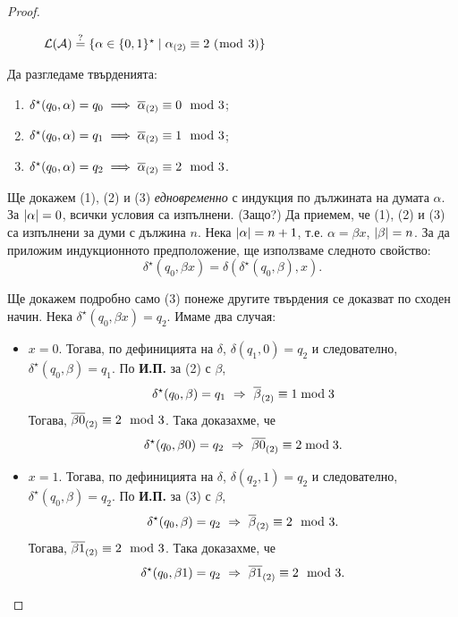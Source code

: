 \begin{proof}
\begin{framed}
\begin{figure}[H]
\begin{center}
      \end{center}
      \caption{$\L(\A) \stackrel{?}{=} \{\alpha\in\{0,1\}^\star \mid \alpha_{(2)} \equiv 2\ (\bmod\ 3)\}$}
 \end{figure}
 \end{framed}
 \noindent Да разгледаме твърденията:
 \begin{enumerate}[(1)]
  \item 
    $\delta^\star(q_0,\alpha) = q_0 \implies \overline{\alpha}_{(2)} \equiv 0 \mod 3$;
  \item 
    $\delta^\star(q_0,\alpha) = q_1 \implies \overline{\alpha}_{(2)} \equiv 1 \mod 3$;
  \item 
    $\delta^\star(q_0,\alpha) = q_2 \implies \overline{\alpha}_{(2)} \equiv 2 \mod 3$.
  \end{enumerate}
  Ще докажем (1), (2) и (3) {\em едновременно} с индукция по дължината на думата $\alpha$.
  За $\lvert{\alpha}\rvert = 0$, всички условия са изпълнени. (Защо?)
  Да приемем, че (1), (2) и (3) са изпълнени за думи с дължина $n$.
  Нека $\lvert{\alpha}\rvert = n+1$, т.е. $\alpha = \beta x$, $\lvert{\beta}\rvert = n$.
  За да приложим индукционното предположение, ще използваме следното свойство:
  \[\delta^\star(q_0,\beta x) = \delta(\delta^\star(q_0,\beta),x).\]
  
  Ще докажем подробно само (3) понеже другите твърдения се доказват по сходен начин.
  Нека $\delta^\star(q_0,\beta x) = q_2$. 
  Имаме два случая:
  \begin{itemize}
  \item 
    $x = 0$. 
    Тогава, по дефиницията на $\delta$, 
    $\delta(q_1,0) = q_2$ и следователно, $\delta^\star(q_0,\beta) = q_1$.
    По {\bf И.П.} за (2) с $\beta$,
    \[\delta^\star(q_0,\beta) = q_1\ \Rightarrow\ \ov{\beta}_{(2)} \equiv 1 \bmod 3\]
    Тогава, $\overline{\beta0}_{(2)} \equiv 2 \mod 3$. Така доказахме, че
    \[\delta^\star(q_0,\beta 0) = q_2\ \Rightarrow\ \overline{\beta 0}_{(2)} \equiv 2 \bmod 3.\]
  \item
    $x = 1$.
    Тогава, по дефиницията на $\delta$, $\delta(q_2,1) = q_2$ и следователно,
    $\delta^\star(q_0,\beta) = q_2$.
    По {\bf И.П.} за (3) с $\beta$,
    \[\delta^\star(q_0,\beta) = q_2\ \Rightarrow\ \ov{\beta}_{(2)} \equiv 2 \mod 3.\]
    Тогава, $\overline{\beta1}_{(2)} \equiv 2 \mod 3$. Така доказахме, че
    \[\delta^\star(q_0,\beta 1) = q_2\ \Rightarrow\ \overline{\beta 1}_{(2)} \equiv 2 \mod 3.\]
  \end{itemize}
  

\end{proof}
